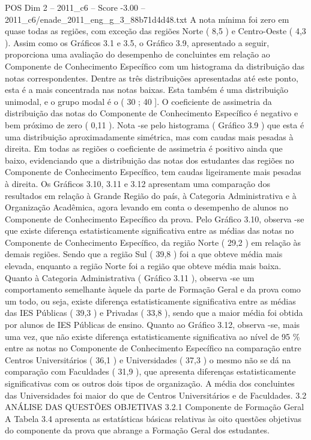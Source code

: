 \begin{textsample}{POS Dim 2 – 2011\_c6 – Score -3.00 – 2011\_c6/enade\_2011\_eng\_g\_3\_88b71d4d48.txt}
A nota mínima foi zero em quase todas as regiões, com exceção das regiões Norte ( 8,5 ) e Centro-Oeste ( 4,3 ).
Assim como os Gráficos 3.1 e 3.5, o Gráfico 3.9, apresentado a seguir, proporciona uma avaliação do desempenho de concluintes em relação ao Componente de Conhecimento Específico com um histograma da distribuição das notas correspondentes.
Dentre as três distribuições apresentadas até este ponto, esta é a mais concentrada nas notas baixas.
Esta também é uma distribuição unimodal, e o grupo modal é o ( 30 ; 40 ].
O coeficiente de assimetria da distribuição das notas do Componente de Conhecimento Específico é negativo e bem próximo de zero ( 0,11 ).
Nota -se pelo histograma ( Gráfico 3.9 ) que esta é uma distribuição aproximadamente simétrica, mas com caudas mais pesadas à direita.
Em todas as regiões o coeficiente de assimetria é positivo ainda que baixo, evidenciando que a distribuição das notas dos estudantes das regiões no Componente de Conhecimento Específico, tem caudas ligeiramente mais pesadas à direita.
Os Gráficos 3.10, 3.11 e 3.12 apresentam uma comparação dos resultados em relação à Grande Região do país, à Categoria Administrativa e à Organização Acadêmica, agora levando em conta o desempenho de alunos no Componente de Conhecimento Específico da prova.
Pelo Gráfico 3.10, observa -se que existe diferença estatisticamente significativa entre as médias das notas no Componente de Conhecimento Específico, da região Norte ( 29,2 ) em relação às demais regiões.
Sendo que a região Sul ( 39,8 ) foi a que obteve média mais elevada, enquanto a região Norte foi a região que obteve média mais baixa.
Quanto à Categoria Administrativa ( Gráfico 3.11 ), observa -se um comportamento semelhante àquele da parte de Formação Geral e da prova como um todo, ou seja, existe diferença estatisticamente significativa entre as médias das IES Públicas ( 39,3 ) e Privadas ( 33,8 ), sendo que a maior média foi obtida por alunos de IES Públicas de ensino.
Quanto ao Gráfico 3.12, observa -se, mais uma vez, que não existe diferença estatisticamente significativa ao nível de 95 \% entre as notas no Componente de Conhecimento Específico na comparação entre Centros Universitários ( 36,1 ) e Universidades ( 37,3 ) o mesmo não se dá na comparação com Faculdades ( 31,9 ), que apresenta diferenças estatisticamente significativas com os outros dois tipos de organização.
A média dos concluintes das Universidades foi maior do que de Centros Universitários e de Faculdades. 3.2 ANÁLISE DAS QUESTÕES OBJETIVAS 3.2.1 Componente de Formação Geral A Tabela 3.4 apresenta as estatísticas básicas relativas às oito questões objetivas do componente da prova que abrange a Formação Geral dos estudantes.

\end{textsample}
